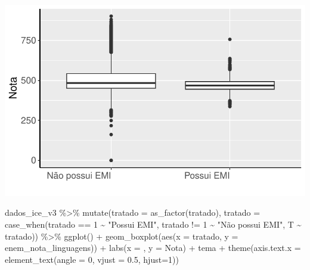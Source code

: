 \documentclass[
  letterpaper,
  DIV=11,
  numbers=noendperiod]{scrartcl}
\newenvironment{Shaded}{\begin{snugshade}}{\end{snugshade}}
\newcommand{\AttributeTok}[1]{\textcolor[rgb]{0.40,0.45,0.13}{#1}}
\newcommand{\DecValTok}[1]{\textcolor[rgb]{0.68,0.00,0.00}{#1}}
\newcommand{\FloatTok}[1]{\textcolor[rgb]{0.68,0.00,0.00}{#1}}
\newcommand{\FunctionTok}[1]{\textcolor[rgb]{0.28,0.35,0.67}{#1}}
\newcommand{\NormalTok}[1]{\textcolor[rgb]{0.00,0.23,0.31}{#1}}
\newcommand{\SpecialCharTok}[1]{\textcolor[rgb]{0.37,0.37,0.37}{#1}}
\newcommand{\StringTok}[1]{\textcolor[rgb]{0.13,0.47,0.30}{#1}}
\begin{document}
\includegraphics[width=1\textwidth,height=1\textheight]{script_files/figure-latex/unnamed-chunk-9-2.pdf}

\begin{Shaded}
\begin{Highlighting}[]
\NormalTok{dados\_ice\_v3 }\SpecialCharTok{\%\textgreater{}\%} 
  \FunctionTok{mutate}\NormalTok{(}\AttributeTok{tratado =} \FunctionTok{as\_factor}\NormalTok{(tratado),}
    \AttributeTok{tratado =} \FunctionTok{case\_when}\NormalTok{(tratado }\SpecialCharTok{==} \DecValTok{1} \SpecialCharTok{\textasciitilde{}} \StringTok{"Possui EMI"}\NormalTok{,}
\NormalTok{                        tratado }\SpecialCharTok{!=} \DecValTok{1} \SpecialCharTok{\textasciitilde{}} \StringTok{"Não possui EMI"}\NormalTok{,}
\NormalTok{                        T }\SpecialCharTok{\textasciitilde{}}\NormalTok{ tratado)) }\SpecialCharTok{\%\textgreater{}\%} 
  \FunctionTok{ggplot}\NormalTok{() }\SpecialCharTok{+}
  \FunctionTok{geom\_boxplot}\NormalTok{(}\FunctionTok{aes}\NormalTok{(}\AttributeTok{x =}\NormalTok{ tratado, }\AttributeTok{y =}\NormalTok{ enem\_nota\_linguagens)) }\SpecialCharTok{+}
  \FunctionTok{labs}\NormalTok{(}\AttributeTok{x =}  \StringTok{\textquotesingle{}\textquotesingle{}}\NormalTok{, }\AttributeTok{y =} \StringTok{\textquotesingle{}Nota\textquotesingle{}}\NormalTok{) }\SpecialCharTok{+}
\NormalTok{  tema }\SpecialCharTok{+}
  \FunctionTok{theme}\NormalTok{(}\AttributeTok{axis.text.x =} \FunctionTok{element\_text}\NormalTok{(}\AttributeTok{angle =} \DecValTok{0}\NormalTok{, }\AttributeTok{vjust =} \FloatTok{0.5}\NormalTok{, }\AttributeTok{hjust=}\DecValTok{1}\NormalTok{))}
\end{Highlighting}
\end{Shaded}
\end{document}

